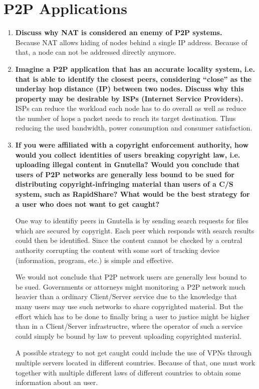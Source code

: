 \documentclass{article}
\begin{document}
\section{P2P Applications}
  \begin{enumerate}[1]
    \item \textbf{Discuss why NAT is considered an enemy of P2P systems.} \\
          Because NAT allows hiding of nodes behind a single IP address. Because of that, a node can not be addressed directly anymore.
    \item \textbf{Imagine a P2P application that has an accurate locality system, i.e. that is able to identify the closest peers, considering “close” as the underlay hop distance (IP) between two nodes. Discuss why this property may be desirable by ISPs (Internet Service Providers).} \\
          ISPs can reduce the workload each node has to do overall as well as reduce the number of hops a packet needs to reach its target destination.
          Thus reducing the used bandwidth, power consumption and consumer satisfaction.

    \item \textbf{If you were affiliated with a copyright enforcement authority, how would you collect identities of users breaking copyright law, i.e. uploading illegal content in Gnutella? Would you conclude that users of P2P networks are generally less bound to be sued for distributing copyright-infringing material than users of a C/S system, such as RapidShare? What would be the best strategy for a user who does not want to get caught?}

          One way to identifiy peers in Gnutella is by sending search requests
          for files which are secured by copyright. Each peer which responds
          with search  results could then be identified. Since the content
          cannot be checked by a central authority corrupting the content with
          some sort of tracking device (information, program, etc.) is simple
          and effective.

          We would not conclude that P2P network users are generally less
          bound to be sued. Governments or attorneys might monitoring a P2P
          network  much heavier than a ordinary Client/Server service due to
          the knowledge that many users may use such networks to share
          copyrighted material. But the effort which has to be done to finally
          bring a user to justice might be higher than in a Client/Server
          infrastructre,  where the operator of such a service could simply be
          bound by law to prevent uploading copyrighted material.

          A possible strategy to not get caught could include the use of VPNs
          through multiple servers located in different countries. Because of
          that, one must work together with multiple different laws of
          different countries to obtain some information about an user.


  \end{enumerate}
\end{document}
